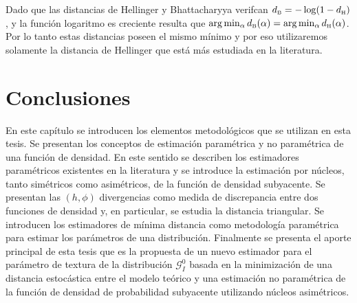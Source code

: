 Dado que las distancias de Hellinger y Bhattacharyya verifcan $d_\text{\tiny B}=-\log(1-d_\text{\tiny H})$, y la función logaritmo es creciente resulta que $\arg\min_\alpha d_\text{\tiny B}(\alpha )=\arg\min_ \alpha d_\text{\tiny H}(\alpha )$. Por lo tanto estas distancias poseen el mismo mínimo y por eso utilizaremos solamente la distancia de Hellinger que está más estudiada en la literatura.

\section{Conclusiones}

En este capítulo se introducen los elementos metodológicos que se utilizan en esta tesis. Se presentan los conceptos de estimación paramétrica y no paramétrica de una función de densidad. En este sentido se describen los estimadores  paramétricos existentes en la literatura y se introduce la estimación por núcleos, tanto simétricos como asimétricos, de la función de densidad subyacente.  Se  presentan las $(h,\phi)$ divergencias como medida de discrepancia entre dos funciones de densidad y, en particular, se estudia la distancia triangular. Se introducen los estimadores de mínima distancia como metodología paramétrica para estimar los parámetros de una distribución. Finalmente se presenta el aporte principal de esta tesis que es la propuesta de un nuevo estimador para el parámetro de textura de la distribución $\mathcal{G}_I^0$ basada en la minimización de una distancia estocástica entre el modelo teórico y una estimación no paramétrica de la función de densidad de probabilidad subyacente utilizando núcleos asimétricos.